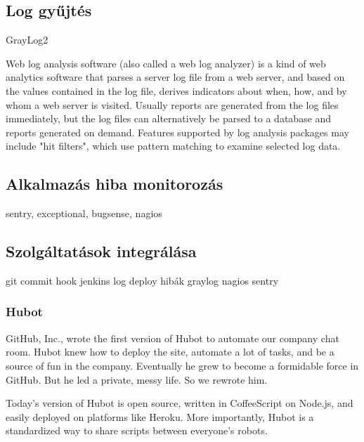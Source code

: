 \subsection{Log gyűjtés}
GrayLog2

Web log analysis software (also called a web log analyzer) is a kind of web analytics software that parses a server log file from a web server, and based on the values contained in the log file, derives indicators about when, how, and by whom a web server is visited. Usually reports are generated from the log files immediately, but the log files can alternatively be parsed to a database and reports generated on demand.
Features supported by log analysis packages may include "hit filters", which use pattern matching to examine selected log data.

\subsection{Alkalmazás hiba monitorozás}
sentry, exceptional, bugsense, nagios


\subsection{Szolgáltatások integrálása}
git commit hook
jenkins log
deploy
hibák
graylog
nagios
sentry
\subsubsection{Hubot}

GitHub, Inc., wrote the first version of Hubot to automate our company chat room. Hubot knew how to deploy the site, automate a lot of tasks, and be a source of fun in the company. Eventually he grew to become a formidable force in GitHub. But he led a private, messy life. So we rewrote him.

Today's version of Hubot is open source, written in CoffeeScript on Node.js, and easily deployed on platforms like Heroku. More importantly, Hubot is a standardized way to share scripts between everyone's robots.